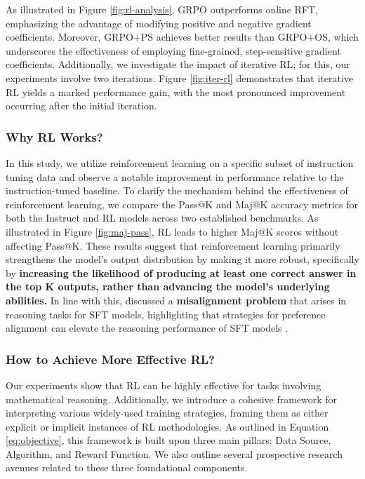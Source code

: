 \begin{itemize}[topsep=0pt]
\begin{itemize}[topsep=0pt]
As illustrated in Figure \ref{fig:rl-analysis}, GRPO outperforms online RFT, emphasizing the advantage of modifying positive and negative gradient coefficients. Moreover, GRPO+PS achieves better results than GRPO+OS, which underscores the effectiveness of employing fine-grained, step-sensitive gradient coefficients. Additionally, we investigate the impact of iterative RL; for this, our experiments involve two iterations. Figure \ref{fig:iter-rl} demonstrates that iterative RL yields a marked performance gain, with the most pronounced improvement occurring after the initial iteration.

\subsubsection{Why RL Works?} In this study, we utilize reinforcement learning on a specific subset of instruction tuning data and observe a notable improvement in performance relative to the instruction-tuned baseline. To clarify the mechanism behind the effectiveness of reinforcement learning, we compare the Pass@K and Maj@K accuracy metrics for both the Instruct and RL models across two established benchmarks. As illustrated in Figure \ref{fig:maj-pass}, RL leads to higher Maj@K scores without affecting Pass@K. These results suggest that reinforcement learning primarily strengthens the model's output distribution by making it more robust, specifically by \textbf{increasing the likelihood of producing at least one correct answer in the top K outputs, rather than advancing the model’s underlying abilities.} In line with this, \citep{wang2023making} discussed a \textbf{misalignment problem} that arises in reasoning tasks for SFT models, highlighting that strategies for preference alignment can elevate the reasoning performance of SFT models \citep{yuan2023rrhf,song2023preference,wang2023making}.

\subsubsection{How to Achieve More Effective RL?}
\label{sec:effec_rl}
Our experiments show that RL can be highly effective for tasks involving mathematical reasoning. Additionally, we introduce a cohesive framework for interpreting various widely-used training strategies, framing them as either explicit or implicit instances of RL methodologies. As outlined in Equation \ref{eq:objective}, this framework is built upon three main pillars: Data Source, Algorithm, and Reward Function. We also outline several prospective research avenues related to these three foundational components.


\end{itemize}
\end{itemize}
